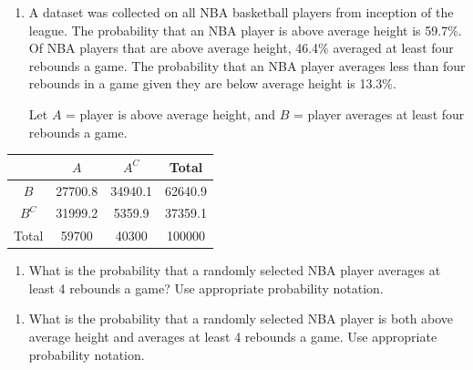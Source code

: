 \documentclass[
]{report}
\providecommand{\tightlist}{%
  \setlength{\itemsep}{0pt}\setlength{\parskip}{0pt}}
\begin{document}
\begin{enumerate}
\def\labelenumi{\arabic{enumi}.}
\item
  A dataset was collected on all NBA basketball players from inception of the league. The probability that an NBA player is above average height is 59.7\%. Of NBA players that are above average height, 46.4\% averaged at least four rebounds a game. The probability that an NBA player averages less than four rebounds in a game given they are below average height is 13.3\%.
  \vspace{1mm}

  Let \(A\) = player is above average height, and \(B\) = player averages at least four rebounds a game.
  \vspace{0.1in}
\end{enumerate}

\begin{center}
\begin{tabular}{|c|c|c|c|} \hline
\hspace{0.8in} & \hspace{0.25in} $A$ \hspace{.25in} & \hspace{0.25in} $A^C$ \hspace{0.25in} & \hspace{0.25in} Total \hspace{0.25in} \\ \hline $B$ & 27700.8 & 34940.1 & 62640.9 \\ \hline
 $B^C$ & 31999.2 & 5359.9 & 37359.1 \\ \hline
Total & 59700 & 40300 & 100000 \\ \hline
\end{tabular}
\end{center}
\vspace{.1in}

\begin{enumerate}
\def\labelenumi{\alph{enumi}.}
\tightlist
\item
  What is the probability that a randomly selected NBA player averages at least 4 rebounds a game? Use appropriate probability notation.
\end{enumerate}

\vspace{0.5in}

\begin{enumerate}
\def\labelenumi{\alph{enumi}.}
\setcounter{enumi}{1}
\tightlist
\item
  What is the probability that a randomly selected NBA player is both above average height and averages at least 4 rebounds a game. Use appropriate probability notation.
\end{enumerate}
\end{document}
